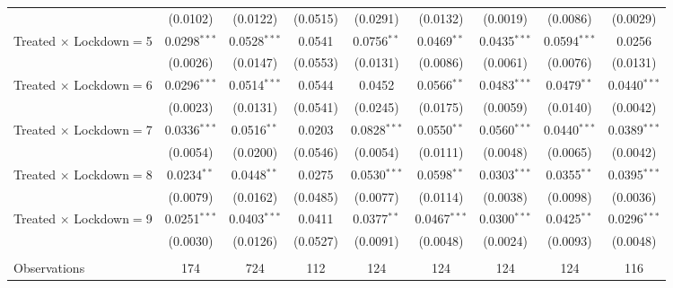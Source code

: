 \begin{tabular}{lcccccccc}
                                   & (0.0102)       & (0.0122)       & (0.0515)      & (0.0291)       & (0.0132)       & (0.0019)       & (0.0086)       & (0.0029)\\
   Treated $\times$ Lockdown$=$5  & 0.0298$^{***}$ & 0.0528$^{***}$ & 0.0541        & 0.0756$^{**}$  & 0.0469$^{**}$  & 0.0435$^{***}$ & 0.0594$^{***}$ & 0.0256\\
                                   & (0.0026)       & (0.0147)       & (0.0553)      & (0.0131)       & (0.0086)       & (0.0061)       & (0.0076)       & (0.0131)\\
   Treated $\times$ Lockdown$=$6  & 0.0296$^{***}$ & 0.0514$^{***}$ & 0.0544        & 0.0452         & 0.0566$^{**}$  & 0.0483$^{***}$ & 0.0479$^{**}$  & 0.0440$^{***}$\\
                                   & (0.0023)       & (0.0131)       & (0.0541)      & (0.0245)       & (0.0175)       & (0.0059)       & (0.0140)       & (0.0042)\\
   Treated $\times$ Lockdown$=$7  & 0.0336$^{***}$ & 0.0516$^{**}$  & 0.0203        & 0.0828$^{***}$ & 0.0550$^{**}$  & 0.0560$^{***}$ & 0.0440$^{***}$ & 0.0389$^{***}$\\
                                   & (0.0054)       & (0.0200)       & (0.0546)      & (0.0054)       & (0.0111)       & (0.0048)       & (0.0065)       & (0.0042)\\
   Treated $\times$ Lockdown$=$8  & 0.0234$^{**}$  & 0.0448$^{**}$  & 0.0275        & 0.0530$^{***}$ & 0.0598$^{**}$  & 0.0303$^{***}$ & 0.0355$^{**}$  & 0.0395$^{***}$\\
                                   & (0.0079)       & (0.0162)       & (0.0485)      & (0.0077)       & (0.0114)       & (0.0038)       & (0.0098)       & (0.0036)\\
   Treated $\times$ Lockdown$=$9  & 0.0251$^{***}$ & 0.0403$^{***}$ & 0.0411        & 0.0377$^{**}$  & 0.0467$^{***}$ & 0.0300$^{***}$ & 0.0425$^{**}$  & 0.0296$^{***}$\\
                                   & (0.0030)       & (0.0126)       & (0.0527)      & (0.0091)       & (0.0048)       & (0.0024)       & (0.0093)       & (0.0048)\\
                                   &                &                &               &                &                &                &                &  \\
   Observations                    & 174            & 724            & 112           & 124            & 124            & 124            & 124            & 116\\

\end{tabular}
